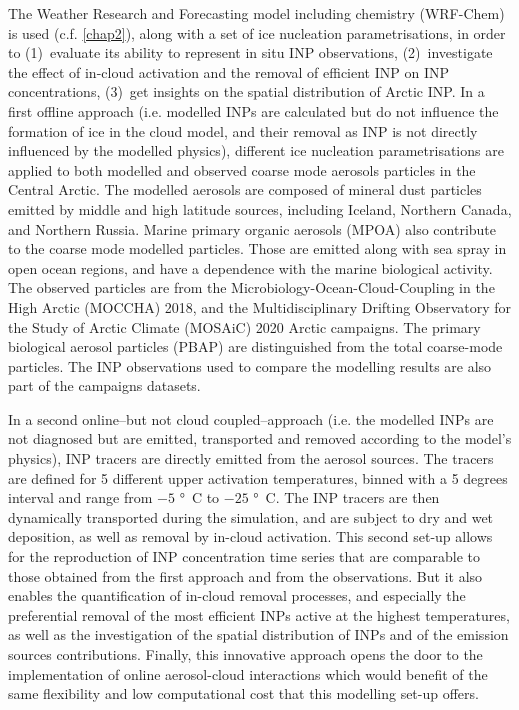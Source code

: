 
\vspace{\baselineskip}
The Weather Research and Forecasting model including chemistry (WRF-Chem) is used (c.f. \cref{chap2}), along with a set of ice nucleation parametrisations, in order to (1)~evaluate its ability to represent in situ INP observations, (2)~investigate the effect of in-cloud activation and the removal of efficient INP on INP concentrations, (3)~get insights on the spatial distribution of Arctic INP.
    In a first offline approach (i.e. modelled INPs are calculated but do not influence the formation of ice in the cloud model, and their removal as INP is not directly influenced by the modelled physics), different ice nucleation parametrisations are applied to both modelled and observed coarse mode aerosols particles in the Central Arctic. The modelled aerosols are composed of mineral dust particles emitted by middle and high latitude sources, including Iceland, Northern Canada, and Northern Russia. Marine primary organic aerosols (MPOA) also contribute to the coarse mode modelled particles. Those are emitted along with sea spray in open ocean regions, and have a dependence with the marine biological activity.
    The observed particles are from the Microbiology-Ocean-Cloud-Coupling in the High Arctic (MOCCHA) 2018, and the Multidisciplinary Drifting Observatory for the Study of Arctic Climate (MOSAiC) 2020 \citep{frickenhaus_data_2022} Arctic campaigns. 
    The primary biological aerosol particles (PBAP) are distinguished from the total coarse-mode particles.
    The INP observations used to compare the modelling results are also part of the campaigns datasets.
    
    In a second online\---but not cloud coupled\---approach (i.e. the modelled INPs are not diagnosed but are emitted, transported and removed according to the model's physics), INP tracers are directly emitted from the aerosol sources. The tracers are defined for 5 different upper activation temperatures, binned with a 5 degrees interval and range from $-5$ \unit{\degree C} to $-25$ \unit{\degree C}.
    The INP tracers are then dynamically transported during the simulation, and are subject to dry and wet deposition, as well as removal by in-cloud activation.
    This second set-up allows for the reproduction of INP concentration time series that are comparable to those obtained from the first approach and from the observations.
   But it also enables the quantification of in-cloud removal processes, and especially the preferential removal of the most efficient INPs active at the highest temperatures, as well as the investigation of the spatial distribution of INPs and of the emission sources contributions. 
    Finally, this innovative approach opens the door to the implementation of online aerosol-cloud interactions which would benefit of the same  flexibility and low computational cost that this modelling set-up offers.

